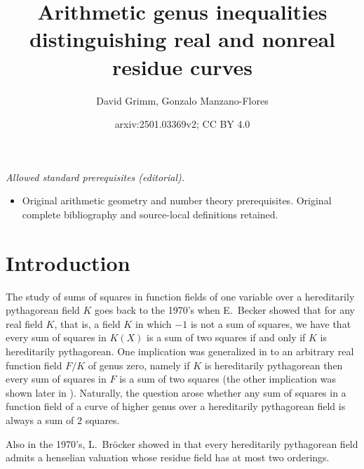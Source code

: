 \documentclass[a4paper,12pt,reqno]{amsart}
\title{Arithmetic genus inequalities distinguishing real and nonreal residue curves}
\author{David Grimm, Gonzalo Manzano-Flores}
\date{arxiv:2501.03369v2; CC BY 4.0}
\theoremstyle{definition}
\numberwithin{equation}{thm}
\begin{document}
\maketitle
\noindent\textit{Allowed standard prerequisites (editorial).}\begin{itemize}
\item Original arithmetic geometry and number theory prerequisites. Original complete bibliography and source-local definitions retained.
\end{itemize}\medskip
\section{Introduction} %

The study of sums of squares in function fields of one variable over a hereditarily pythagorean field $K$ goes back to the 1970's when E.~Becker showed that for any real field $K$, that is, a field $K$ in which $-1$ is not a sum of squares, we have that every sum of squares in $K(X)$ is a sum of two squares if and only if $K$ is hereditarily pythagorean. One implication was generalized in \cite{TY03} to an arbitrary real function field $F/K$ of genus zero, namely if $K$ is hereditarily pythagorean then every sum of squares in $F$ is a sum of two squares (the other implication was shown later in \cite{Gr13}). Naturally, the question arose whether any sum of squares in a function field of a curve of higher genus over a hereditarily pythagorean field is always a sum of $2$ squares. 

Also in the 1970's, L.~Br\"ocker showed in \cite{Br76} that every hereditarily pythagorean field admits a henselian valuation whose residue field has at most two orderings. 
\end{document}
